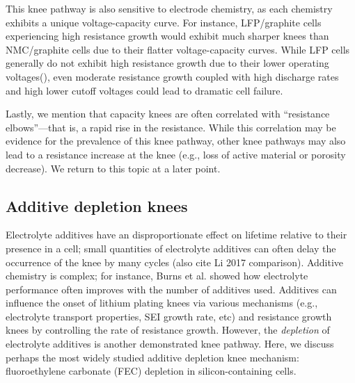 \documentclass[journal=jpclcd,manuscript=article]{achemso}
\begin{document}
This knee pathway is also sensitive to electrode chemistry, as each chemistry exhibits a unique voltage-capacity curve. For instance, LFP/graphite cells experiencing high resistance growth would exhibit much sharper knees than NMC/graphite cells due to their flatter voltage-capacity curves. While LFP cells generally do not exhibit high resistance growth due to their lower operating voltages(), even moderate resistance growth coupled with high discharge rates and high lower cutoff voltages could lead to dramatic cell failure.

Lastly, we mention that capacity knees are often correlated with ``resistance elbows''---that is, a rapid rise in the resistance. While this correlation may be evidence for the prevalence of this knee pathway, other knee pathways may also lead to a resistance increase at the knee (e.g., loss of active material or porosity decrease). We return to this topic at a later point.

\subsection{Additive depletion knees}

Electrolyte additives have an disproportionate effect on lifetime relative to their presence in a cell; small quantities of electrolyte additives can often delay the occurrence of the knee by many cycles\cite{ma_editors_2019} (also cite Li 2017 comparison). Additive chemistry is complex; for instance, Burns et al.\cite{burns_predicting_2013} showed how electrolyte performance often improves with the number of additives used. Additives can influence the onset of lithium plating knees via various mechanisms (e.g., electrolyte transport properties, SEI growth rate, etc) and resistance growth knees by controlling the rate of resistance growth\cite{ma_editors_2019}. However, the \textit{depletion} of electrolyte additives is another demonstrated knee pathway. Here, we discuss perhaps the most widely studied additive depletion knee mechanism: fluoroethylene carbonate (FEC) depletion in silicon-containing cells.
\end{document}
